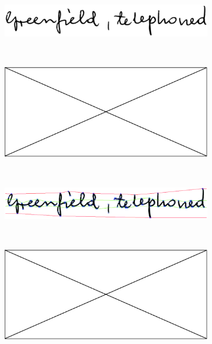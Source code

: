 \begin{figure}
\centering
\begin{subfigure}[b]{0.8\textwidth}
\centering
\includegraphics[width=\textwidth]{images/comp_seg_original.eps}
\caption{}\label{fig:comp_seg_original}
\end{subfigure}\\
\begin{subfigure}[b]{0.45\textwidth}
\centering
\includegraphics[width=\textwidth]{images/pending_image.eps}
\caption{}\label{fig:comp_seg_heur_result}
\end{subfigure}
~
\begin{subfigure}[b]{0.45\textwidth}
\centering
\includegraphics[width=\textwidth]{images/comp_seg_mlp_result.eps}
\caption{}\label{fig:comp_seg_mlp_result}
\end{subfigure}\\
\begin{subfigure}[b]{0.45\textwidth}
\centering
\includegraphics[width=\textwidth]{images/pending_image.eps}

\end{subfigure}
\end{figure}
